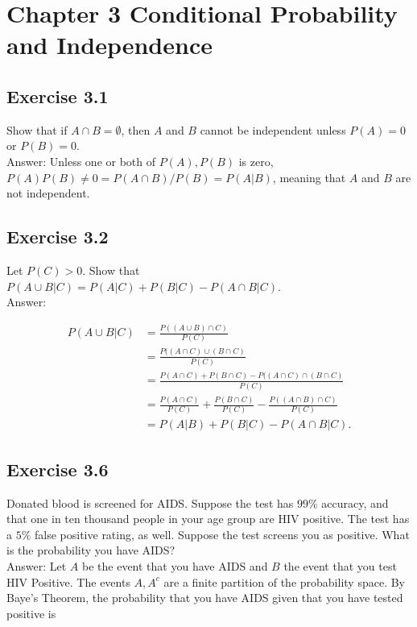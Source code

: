 \documentclass{article}
\begin{document}
\newpage
\section*{Chapter 3 Conditional Probability and Independence}

\subsection*{Exercise 3.1}

Show that if $A \cap B = \emptyset$, then $A$ and $B$ cannot be independent unless $P(A) = 0$ or $P(B) = 0$. \\

Answer: Unless one or both of $P(A), P(B)$ is zero, $P(A)P(B) \neq 0 = P(A\cap B) / P(B) = P(A \vert B)$, meaning that $A$ and $B$ are not independent.

\subsection*{Exercise 3.2} Let $P(C) > 0$. Show that $P(A \cup B \vert C) = P(A \vert C) + P(B \vert C) - P(A \cap B \vert C)$. \\

Answer:

\begin{align*}
P(A\cup B \vert C) &= \frac{P((A\cup B) \cap C)}{P(C)} \\
&= \frac{P((A\cap C) \cup (B \cap C)}{P(C)} \\
&= \frac{P(A \cap C) + P(B \cap C) - P((A\cap C) \cap (B \cap C)}{P(C)} \\
&= \frac{P(A\cap C)}{P(C)} + \frac{P(B\cap C)}{P(C)} - \frac{P((A\cap B) \cap C)}{P(C)} \\
&= P(A \vert B) + P(B \vert C) - P(A\cap B \vert C).
\end{align*}

\subsection*{Exercise 3.6}

Donated blood is screened for AIDS. Suppose the test has $99\%$ accuracy, and that one in ten thousand people in your age group are HIV positive. The test has a $5\%$ false positive rating, as well. Suppose the test screens you as
positive. What is the probability you have AIDS? \\

Answer: Let $A$ be the event that you have AIDS and $B$ the event that you test HIV Positive. The events $A, A^c$ are a finite partition of the probability space. By Baye's Theorem, the probability that you have AIDS given that you have tested positive is
\end{document}

